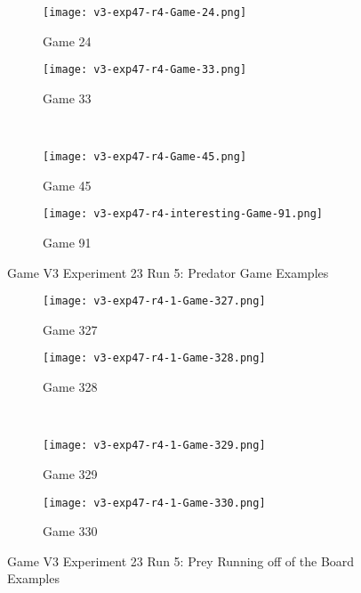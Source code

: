 \begin{figure}
  \centering
  \begin{subfigure}{0.4\textwidth}
    \centering
    \texttt{[image: v3-exp47-r4-Game-24.png]}
    \caption{Game 24}
  \end{subfigure}
  \begin{subfigure}{0.4\textwidth}
    \centering
    \texttt{[image: v3-exp47-r4-Game-33.png]}
    \caption{Game 33}
  \end{subfigure} \\\hfill
  
  \begin{subfigure}{0.4\textwidth}
    \centering
    \texttt{[image: v3-exp47-r4-Game-45.png]}
    \caption{Game 45}
  \end{subfigure}
  \begin{subfigure}{0.4\textwidth}
    \centering
    \texttt{[image: v3-exp47-r4-interesting-Game-91.png]}
    \caption{Game 91}
  \end{subfigure}
  \caption{Game V3 Experiment 23 Run 5: Predator Game Examples\label{fig:v3-pred-best-games}}
\end{figure}


\begin{figure}
  \centering
  \begin{subfigure}{0.4\textwidth}
    \centering
    \texttt{[image: v3-exp47-r4-1-Game-327.png]}
    \caption{Game 327}
  \end{subfigure}
  \begin{subfigure}{0.4\textwidth}
    \centering
    \texttt{[image: v3-exp47-r4-1-Game-328.png]}
    \caption{Game 328}
  \end{subfigure} \\\hfill
  
  \begin{subfigure}{0.4\textwidth}
    \centering
    \texttt{[image: v3-exp47-r4-1-Game-329.png]}
    \caption{Game 329}
  \end{subfigure}
  \begin{subfigure}{0.4\textwidth}
    \centering
    \texttt{[image: v3-exp47-r4-1-Game-330.png]}
    \caption{Game 330}
  \end{subfigure}
  \caption{Game V3 Experiment 23 Run 5: Prey Running off of the Board Examples\label{fig:v3-prey-running-off-board}}
\end{figure}


